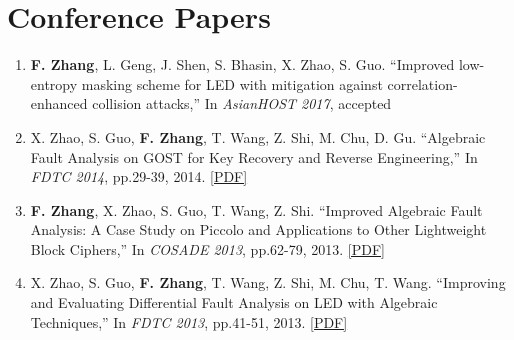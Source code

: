 \documentclass[11pt]{article}
\begin{document}
\section*{Conference Papers}
\begin{enumerate}
\item {\bf F. Zhang}, L. Geng, J. Shen, S. Bhasin, X. Zhao, S. Guo. ``Improved low-entropy masking scheme for LED with mitigation against correlation-enhanced collision attacks,'' In {\it AsianHOST 2017}, {\color{blue}accepted}

\item X. Zhao, S. Guo, {\bf F. Zhang}, T. Wang, Z. Shi, M. Chu, D. Gu. ``Algebraic Fault Analysis on GOST for Key Recovery and Reverse Engineering,'' In {\it FDTC 2014}, pp.29-39, 2014. \href{http://www.isee.zju.edu.cn/fanzhang/publications/2014\_FDTC\_Gost.pdf}{[PDF]}

\item {\bf F. Zhang}, X. Zhao, S. Guo, T. Wang, Z. Shi. ``Improved Algebraic Fault Analysis: A Case Study on Piccolo and Applications to Other Lightweight Block Ciphers,'' In {\it COSADE 2013}, pp.62-79, 2013. \href{http://www.isee.zju.edu.cn/fanzhang/publications/2013\_cosade\_Piccolo.pdf}{[PDF]}

\item X. Zhao, S. Guo, {\bf F. Zhang}, T. Wang, Z. Shi, M. Chu, T. Wang. ``Improving and Evaluating Differential Fault Analysis on LED with Algebraic Techniques,'' In {\it FDTC 2013}, pp.41-51, 2013. \href{http://www.isee.zju.edu.cn/fanzhang/publications/2013\_FDTC\_led.pdf}{[PDF]}


\end{enumerate}
\end{document}
